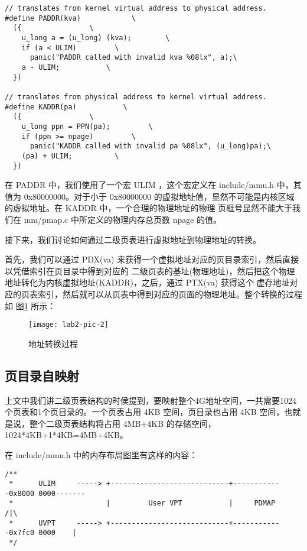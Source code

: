 \begin{verbatim}
// translates from kernel virtual address to physical address.
#define PADDR(kva)            \
  ({                \
    u_long a = (u_long) (kva);        \
    if (a < ULIM)         \
      panic("PADDR called with invalid kva %08lx", a);\
    a - ULIM;           \
  })

// translates from physical address to kernel virtual address.
#define KADDR(pa)           \
  ({                \
    u_long ppn = PPN(pa);         \
    if (ppn >= npage)         \
      panic("KADDR called with invalid pa %08lx", (u_long)pa);\
    (pa) + ULIM;          \
  })
\end{verbatim}

在 PADDR 中，我们使用了一个宏 ULIM ，这个宏定义在 include/mmu.h 中，其值为 0x80000000。对于小于
 0x80000000 的虚拟地址值，显然不可能是内核区域的虚拟地址。在 KADDR 中，一个合理的物理地址的物理
页框号显然不能大于我们在 mm/pmap.c 中所定义的物理内存总页数 npage 的值。

接下来，我们讨论如何通过二级页表进行虚拟地址到物理地址的转换。

首先，我们可以通过 PDX(va) 来获得一个虚拟地址对应的页目录索引，然后直接以凭借索引在页目录中得到对应的
二级页表的基址(物理地址)，然后把这个物理地址转化为内核虚拟地址(KADDR)，之后，通过 PTX(va) 获得这个
虚存地址对应的页表索引，然后就可以从页表中得到对应的页面的物理地址。整个转换的过程如 图\ref{lab2-pic-2}
所示：

\begin{figure}[htbp]
  \centering
  \texttt{[image: lab2-pic-2]}
  \caption{地址转换过程}\label{lab2-pic-2}
\end{figure}

\subsection{页目录自映射}

上文中我们讲二级页表结构的时侯提到，要映射整个4G地址空间，一共需要1024个页表和1个页目录的。一个页表占用 4KB
空间，页目录也占用 4KB 空间，也就是说，整个二级页表结构将占用 4MB+4KB 的存储空间，1024*4KB+1*4KB=4MB+4KB。

在 include/mmu.h 中的内存布局图里有这样的内容：

\begin{verbatim}
/**
 *      ULIM     -----> +----------------------------+------------0x8000 0000-------
 *                      |         User VPT           |     PDMAP                /|\
 *      UVPT     -----> +----------------------------+------------0x7fc0 0000    |
 */
\end{verbatim}


